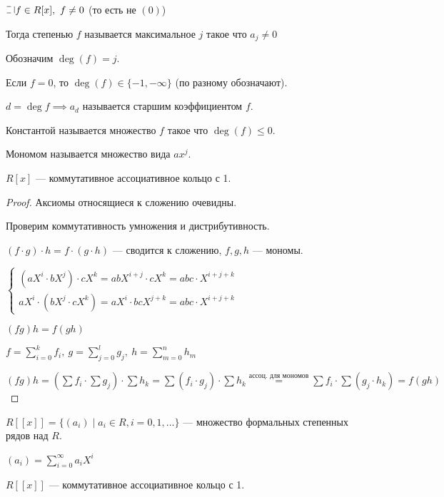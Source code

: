 \begin{defn}
    $\letus f \in R[x],~f \neq 0$ (то есть не $(0)$)

    Тогда степенью $f$ называется максимальное $j$ такое что $a_j \neq 0$

    Обозначим $\deg(f) = j$.

    Если $f = 0$, то $\deg(f) \in \{-1, -\infty\}$ (по разному обозначают).
\end{defn}

\begin{defn}
    $d = \deg f \implies a_d$ называется старшим коэффициентом $f$.
\end{defn}

\begin{defn}
    Константой называется множество $f$ такое что $\deg(f) \leq 0$.
\end{defn}

\begin{defn}
    Мономом называется множество вида $a x^j$.
\end{defn}

\begin{theorem-non}
    $R[x]$ --- коммутативное ассоциативное кольцо с 1.
\end{theorem-non}

\begin{proof}
    Аксиомы относящиеся к сложению очевидны.

    Проверим коммутативность умножения и дистрибутивность.

    $(f \cdot g) \cdot h = f \cdot (g \cdot h)$ --- сводится к сложению, $f, g, h$ --- мономы.

    $\begin{cases}
        (aX^i \cdot bX^j) \cdot cX^k = abX^{i+j} \cdot cX^k = abc \cdot X^{i+j+k}\\
        aX^i \cdot (bX^j \cdot cX^k) = aX^i \cdot bcX^{j + k} = abc \cdot X^{i+j+k}
    \end{cases}$

    $(fg)h = f(gh)$

    $f = \sum\limits_{i=0}^k f_i,~g = \sum\limits_{j=0}^l g_j,~h = \sum\limits_{m=0}^n h_m$

    $(fg)h = (\sum f_i \cdot \sum g_j) \cdot \sum h_k = \sum (f_i \cdot g_j) \cdot \sum h_k \overset{\text{ассоц. для мономов}}{=} \sum f_i \cdot \sum (g_j \cdot h_k) = f(gh)$
\end{proof}

\begin{defn}
    $R[[x]] = \{ (a_i) \mid a_i \in R, i = 0, 1, \ldots \}$ --- множество формальных степенных рядов над $R$.
\end{defn}

$(a_i) = \sum\limits_{i = 0}^{\infty} a_i X^i$

\begin{exerc}
    $R[[x]]$ --- коммутативное ассоциативное кольцо с 1.
\end{exerc}